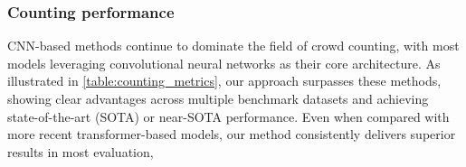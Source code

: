 \subsubsection{Counting performance}
CNN-based methods continue to dominate the field of crowd counting, with most models leveraging convolutional neural networks as their core architecture. As illustrated in \ref{table:counting_metrics}, our approach surpasses these methods, showing clear advantages across multiple benchmark datasets and achieving state-of-the-art (SOTA) or near-SOTA performance. Even when compared with more recent transformer-based models, our method consistently delivers superior results in most evaluation,\\
\begin{table}[htbp]
\centering
{}
\caption{Compared with the advanced methods on ShanghaiTech B. (The best results are shown in \textbf{bold}, and the second best results are \underline{underlined}.)}
\label{table:counting_metrics}
\end{table}

